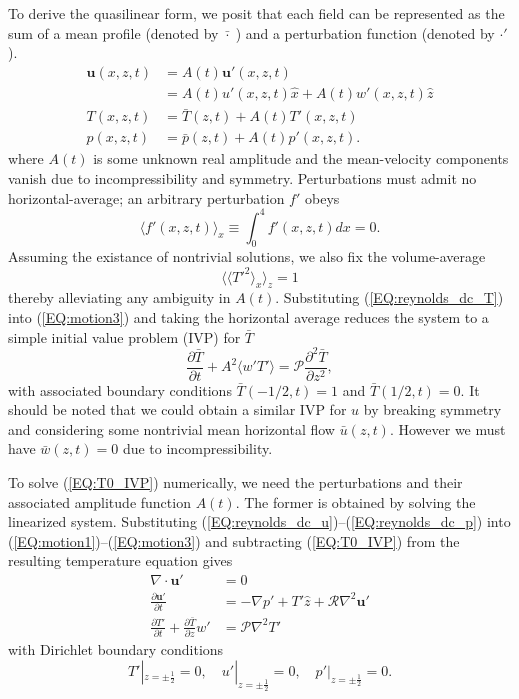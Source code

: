 \documentclass[reprint,amsmath,amssymb,aps]{revtex4-1}
\begin{document}
To derive the quasilinear form, we posit that each field can be represented as the sum of a mean profile (denoted by $\bar{\cdot } \;$) and a perturbation function (denoted by $\cdot'$).
\begin{align}
    \mathbf{u}(x, z, t) &= A(t) \mathbf{u'}(x, z, t) \label{EQ:reynolds_dc_u}\\
    &= A(t) u'(x, z, t)\hat{x} + A(t) w'(x, z, t)\hat{z} \\
    T(x, z, t) &= \bar{T}(z, t) + A(t) T'(x, z, t) \label{EQ:reynolds_dc_T}\\
    p(x, z, t) &= \bar{p}(z, t) + A(t) p'(x, z, t) \label{EQ:reynolds_dc_p}.
\end{align}
where $A(t)$ is some unknown real amplitude and the mean-velocity components vanish due to incompressibility and symmetry. Perturbations must admit no horizontal-average; an arbitrary perturbation $f'$ obeys
\begin{equation}
    \langle f'(x, z, t) \rangle_x \equiv \int_{0}^4 f'(x, z, t) dx = 0.
\end{equation}
Assuming the existance of nontrivial solutions, we also fix the volume-average 
\begin{equation}
  \langle \langle T'^2 \rangle_x \rangle_z = 1
\end{equation}
thereby alleviating any ambiguity in $A(t)$. 
Substituting (\ref{EQ:reynolds_dc_T}) into (\ref{EQ:motion3}) and taking the horizontal average reduces the system to a simple initial value problem (IVP) for $\bar{T}$
\begin{equation}
  \frac{\partial \bar{T}}{\partial t} + A^2 \langle w'T' \rangle = \mathcal{P}  \frac{\partial^2 \bar{T}}{\partial z^2}, \label{EQ:T0_IVP}
\end{equation}
with associated boundary conditions $\bar{T}(-1/2, t) = 1$ and $\bar{T}(1/2, t) = 0$. It should be noted that we could obtain a similar IVP for $u$ by breaking symmetry and considering some nontrivial mean horizontal flow $\bar{u}(z, t)$. However we must have $\bar{w}(z, t) = 0$ due to incompressibility.

To solve (\ref{EQ:T0_IVP}) numerically, we need the perturbations and their associated amplitude function $A(t)$. 
The former is obtained by solving the linearized system. Substituting (\ref{EQ:reynolds_dc_u})--(\ref{EQ:reynolds_dc_p}) into (\ref{EQ:motion1})--(\ref{EQ:motion3}) and subtracting (\ref{EQ:T0_IVP}) from the resulting temperature equation gives
\begin{align}
    \nabla \cdot \mathbf{u'} &= 0 \label{EQ:linear1}\\
    \frac{\partial\mathbf{u'}}{\partial t} &= - \nabla p' + T'\hat{z} + \mathcal{R} \nabla^2 \mathbf{u'} \label{EQ:linear2}\\
    \frac{\partial T'}{\partial t} + \frac{\partial \bar{T}}{\partial z} w' &= \mathcal{P} \nabla^2 T' \label{EQ:linear3}
\end{align}
with Dirichlet boundary conditions 
\begin{equation}
    T'|_{z = \pm \frac{1}{2}} = 0, \quad u'|_{z = \pm \frac{1}{2}} = 0, \quad p'|_{z = \pm \frac{1}{2}} = 0.
\end{equation}
\end{document}
